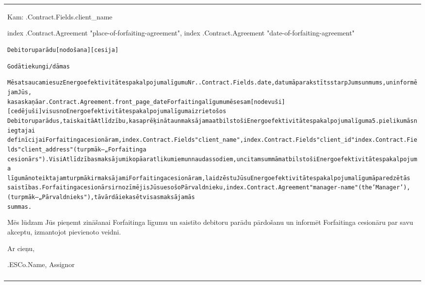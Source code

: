 \documentclass[a4paper]{article}
\begin{document}
\begin{tabu}{|X|} \tabucline{}

  Kam: {{.Contract.Fields.client_name}} \par

  \begin{flushright}
    {{index .Contract.Agreement "place-of-forfaiting-agreement"}}, {{index .Contract.Agreement "date-of-forfaiting-agreement"}}
  \end{flushright}

  \begin{alltt}  Debitoru parādu [nodošana] [cesija]



    Godātie kungi/dāmas



    % TODO: @edimov Fix manager-name to be input %
    Mēs atsaucamies uz Energoefektivitātes pakalpojuma līgumu Nr.  {{.Contract.Fields.date}},datumā parakstīts starp Jums un mums, un informējam Jūs,
ka saskaņā ar {{.Contract.Agreement.front_page_date}} Forfaitinga līgumu mēs esam [nodevuši] [cedējuši] visus no Energoefektivitātes pakalpojuma līguma izrietošos
Debitoru parādus, tai skaitā Atlīdzību, kas aprēķināta un maksājama atbilstoši Energoefektivitātes pakalpojuma līguma 5.pielikumā sniegtajai
definīcijai Forfaitinga cesionāram,   {{index .Contract.Fields "client_name"}},  {{index .Contract.Fields "client_id"}}  {{index .Contract.Fields "client_address"}} (turpmāk – „Forfaitinga
cesionārs"). Visi Atlīdzības maksājumi kopā ar atlikumiem un naudassodiem, un citam summām atbilstoši Energoefektivitātes pakalpojuma
līgumā noteiktajam turpmāk ir maksājami Forfaitinga cesionāram, lai dzēstu Jūsu Energoefektivitātes pakalpojuma līgumā paredzētās
saistības. Forfaitinga cesionārs ir nozīmējis Jūsu esošo Pārvaldnieku, {{index .Contract.Agreement "manager-name"}} (the 'Manager'), (turpmāk – „Pārvaldnieks"), tā vārdā iekasēt visas maksājamās
summas.
  \end{alltt}

  \vspace{5mm}

  Mēs lūdzam Jūs pieņemt zināšanai Forfaitinga līgumu un saistīto debitoru parādu pārdošanu un informēt Forfaitinga cesionāru par savu
akceptu, izmantojot pievienoto veidni.

  \vspace{1cm}

    Ar cieņu,

  \vspace{1cm}

   {{.ESCo.Name}}, Assignor

  \vspace{1cm} \\\tabucline{}

\end{tabu}
\end{document}
